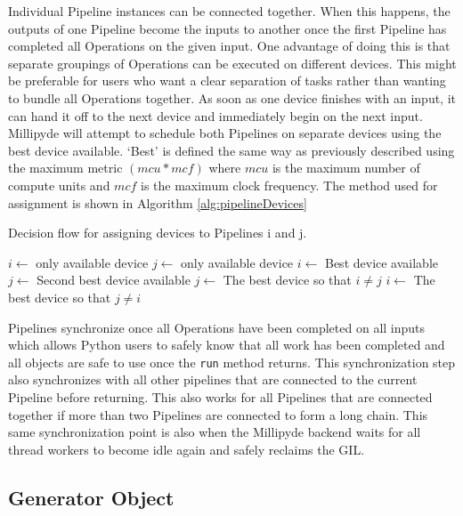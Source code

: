 \quad Individual Pipeline instances can be connected together. When this happens, the outputs of one Pipeline become the inputs to another once the first Pipeline has completed all Operations on the given input. One advantage of doing this is that separate groupings of Operations can be executed on different devices. This might be preferable for users who want a clear separation of tasks rather than wanting to bundle all Operations together. As soon as one device finishes with an input, it can hand it off to the next device and immediately begin on the next input. Millipyde will attempt to schedule both Pipelines on separate devices using the best device available. `Best' is defined the same way as previously described using the maximum metric $(mcu * mcf)$ where $mcu$ is the maximum number of compute units and $mcf$ is the maximum clock frequency. The method used for assignment is shown in Algorithm \ref{alg:pipelineDevices}


\begin{algorithm}
\caption{Decision flow for assigning devices to Pipelines i and j.}
\label{alg:pipelineDevices}
{
    $i\gets$ only available device\;
    $j\gets$ only available device\;
}
{
    $i\gets$ Best device available\;
    $j\gets$ Second best device available\;
}
{
    $j\gets$ The best device so that $i \neq j$\;
}
{
    $i\gets$ The best device so that $j \neq i$\;
}
\phantom{}
\end{algorithm}

\quad Pipelines synchronize once all Operations have been completed on all inputs which allows Python users to safely know that all work has been completed and all objects are safe to use once the \verb|run| method returns. This synchronization step also synchronizes with all other pipelines that are connected to the current Pipeline before returning. This also works for all Pipelines that are connected together if more than two Pipelines are connected to form a long chain. This same synchronization point is also when the Millipyde backend waits for all thread workers to become idle again and safely reclaims the GIL. 


\subsection{Generator Object}

